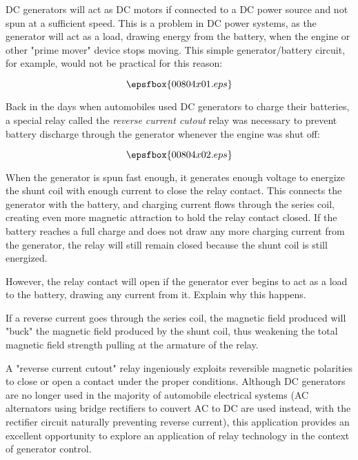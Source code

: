 

DC generators will act as DC motors if connected to a DC power source and not spun at a sufficient speed.  This is a problem in DC power systems, as the generator will act as a load, drawing energy from the battery, when the engine or other "prime mover" device stops moving.  This simple generator/battery circuit, for example, would not be practical for this reason:

$$\epsfbox{00804x01.eps}$$

Back in the days when automobiles used DC generators to charge their batteries, a special relay called the {\it reverse current cutout} relay was necessary to prevent battery discharge through the generator whenever the engine was shut off:

$$\epsfbox{00804x02.eps}$$

When the generator is spun fast enough, it generates enough voltage to energize the shunt coil with enough current to close the relay contact.  This connects the generator with the battery, and charging current flows through the series coil, creating even more magnetic attraction to hold the relay contact closed.  If the battery reaches a full charge and does not draw any more charging current from the generator, the relay will still remain closed because the shunt coil is still energized.

However, the relay contact will open if the generator ever begins to act as a load to the battery, drawing any current from it.  Explain why this happens.







If a reverse current goes through the series coil, the magnetic field produced will "buck" the magnetic field produced by the shunt coil, thus weakening the total magnetic field strength pulling at the armature of the relay.







A "reverse current cutout" relay ingeniously exploits reversible magnetic polarities to close or open a contact under the proper conditions.  Although DC generators are no longer used in the majority of automobile electrical systems (AC alternators using bridge rectifiers to convert AC to DC are used instead, with the rectifier circuit naturally preventing reverse current), this application provides an excellent opportunity to explore an application of relay technology in the context of generator control.




